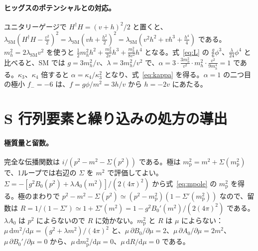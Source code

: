 \documentclass[a4paper,10pt]{ltjsarticle}
\newcommand{\dd}{\mathrm{d}}
\begin{document}
\paragraph{ヒッグスのポテンシャルとの対応。}ユニタリーゲージで $H^\dagger H=(v+h)^2/2$ と置くと、$\lambda_{\mathrm{SM}}(H^\dagger H-\frac{v^2}{2})^2=\lambda_{\mathrm{SM}}(vh+\frac{h^2}{2})^2=\lambda_{\mathrm{SM}}(v^2h^2+vh^3+\frac{h^4}{4})$ である。$m_h^2=2\lambda_{\mathrm{SM}}v^2$ を使うと $\frac12m_h^2h^2+\frac{m_h^2}{2v}h^3+\frac{m_h^2}{8v^2}h^4$ となる。式~\eqref{eq:L} の $\frac g6\phi^3$、$\frac\lambda{24}\phi^4$ と比べると、SM では $g=3m_h^2/v$、$\lambda=3m_h^2/v^2$ で、$\alpha=3\cdot\frac{3m_h^2}{v^2}\cdot m_h^2\cdot\frac{v^2}{9m_h^4}=1$ である。$\kappa_3$、$\kappa_4$ 倍すると $\alpha=\kappa_4/\kappa_3^2$ となり、式~\eqref{eq:kappa} を得る。$\alpha=1$ の二つ目の極小 $f_-=-6$ は、$f=g\phi/m^2=3h/v$ から $h=-2v$ にあたる。

\section{S 行列要素と繰り込みの処方の導出}\label{app:lsz}

\paragraph{極質量と留数。}完全な伝播関数は $i/(p^2-m^2-\Sigma(p^2))$ である。極は $m_{\mathrm p}^2=m^2+\Sigma(m_{\mathrm p}^2)$ で、1ループでは右辺の $\Sigma$ を $m^2$ で評価してよい。$\Sigma=-[g^2B_0(p^2)+\lambda A_0(m^2)]/(2(4\pi)^2)$ から式~\eqref{eq:mpole} の $m_{\mathrm p}^2$ を得る。極のまわりで $p^2-m^2-\Sigma(p^2)\simeq(p^2-m_{\mathrm p}^2)(1-\Sigma'(m_{\mathrm p}^2))$ なので、留数は $R=1/(1-\Sigma')\simeq1+\Sigma'(m^2)=1-g^2B_0'(m^2)/(2(4\pi)^2)$ である。$\lambda A_0$ は $p^2$ によらないので $R$ に効かない。$m_{\mathrm p}^2$ と $R$ は $\mu$ によらない：$\mu\,\dd m^2/\dd\mu=(g^2+\lambda m^2)/(4\pi)^2$ と、$\mu\,\partial B_0/\partial\mu=2$、$\mu\,\partial A_0/\partial\mu=2m^2$、$\mu\,\partial B_0'/\partial\mu=0$ から、$\mu\,\dd m_{\mathrm p}^2/\dd\mu=0$、$\mu\,\dd R/\dd\mu=0$ である。
\end{document}
